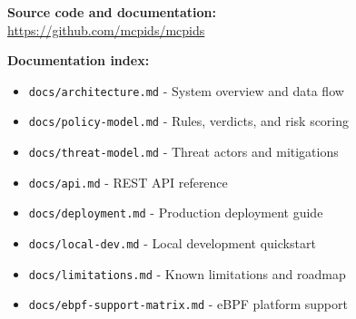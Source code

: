 \documentclass[12pt,a4paper]{report}
\begin{document}
\begin{tcolorbox}[colback=mcpgray,colframe=mcpblue,arc=6pt,
  left=20pt,right=20pt,top=12pt,bottom=12pt]
\textbf{Source code and documentation:}\\
\url{https://github.com/mcpids/mcpids}

\vspace{0.4cm}

\textbf{Documentation index:}
\begin{itemize}[noitemsep]
  \item \texttt{docs/architecture.md} - System overview and data flow
  \item \texttt{docs/policy-model.md} - Rules, verdicts, and risk scoring
  \item \texttt{docs/threat-model.md} - Threat actors and mitigations
  \item \texttt{docs/api.md} - REST API reference
  \item \texttt{docs/deployment.md} - Production deployment guide
  \item \texttt{docs/local-dev.md} - Local development quickstart
  \item \texttt{docs/limitations.md} - Known limitations and roadmap
  \item \texttt{docs/ebpf-support-matrix.md} - eBPF platform support
\end{itemize}
\end{tcolorbox}
\end{document}
